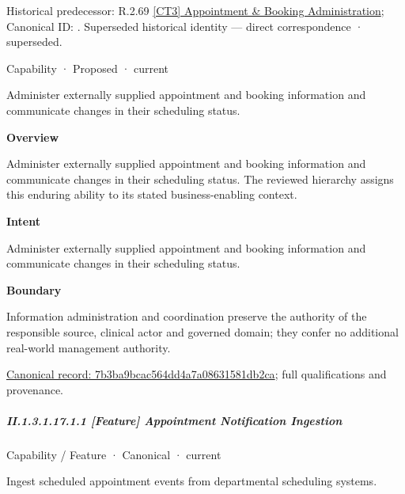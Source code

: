 {\small Historical predecessor: R.2.69 \hyperref[element:cdc16dd0f84049f8af3f1ec76f1e1428]{[CT3] Appointment \& Booking Administration}; Canonical ID: \texttt{}. Superseded historical identity — direct correspondence · superseded.}\par
\label{element:7b3ba9bcac564dd4a7a08631581db2ca}
{\small Capability · Proposed · current}\par

Administer externally supplied appointment and booking information and communicate changes in their scheduling status.



\textbf{Overview}



Administer externally supplied appointment and booking information and communicate changes in their scheduling status. The reviewed hierarchy assigns this enduring ability to its stated business-enabling context.



\textbf{Intent}



Administer externally supplied appointment and booking information and communicate changes in their scheduling status.



\textbf{Boundary}



Information administration and coordination preserve the authority of the responsible source, clinical actor and governed domain; they confer no additional real-world management authority.


{\footnotesize \href{../../../../continuum/strategy/capability/7b3ba9bcac564dd4a7a08631581db2ca.md}{Canonical record: 7b3ba9bcac564dd4a7a08631581db2ca}; full qualifications and provenance.}\par
\subparagraph*{II.1.3.1.17.1.1 [Feature] Appointment Notification Ingestion}
\label{navigation:II.1.3.1.17.1.1}

\label{element:1d5bc2b1742544728357fbea42a55ec4}
{\small Capability / Feature · Canonical · current}\par

Ingest scheduled appointment events from departmental scheduling systems.



